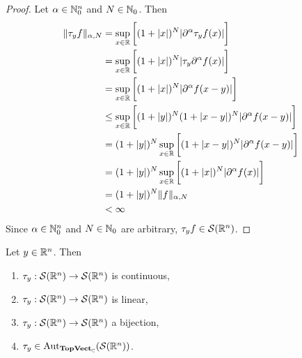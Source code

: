 \documentclass{book}
\begin{document}
	\begin{proof}
		Let $\alpha \in \mathbb{N}_0^n$ and $N \in \mathbb{N}_0$. Then 
		\begin{align*}
			\|\tau_y f\|_{\alpha, N}
			& = \sup_{x \in \mathbb{R}} \bigg[ (1+|x|)^N |\partial^{\alpha} \tau_yf(x)|\bigg] \\
			& =  \sup_{x \in \mathbb{R}} \bigg[ (1+|x|)^N | \tau_y\partial^{\alpha} f(x)|\bigg] \\ 
			& =  \sup_{x \in \mathbb{R}} \bigg[ (1+|x|)^N |\partial^{\alpha} f(x - y)|\bigg] \\ 
			& \leq \sup_{x \in \mathbb{R}} \bigg[ (1+|y|)^N(1 + |x -y|)^N |\partial^{\alpha} f(x - y)|\bigg] \\ 
			& = (1+|y|)^N\sup_{x \in \mathbb{R}} \bigg[ (1 + |x -y|)^N |\partial^{\alpha} f(x - y)|\bigg] \\ 
			& = (1+|y|)^N\sup_{x \in \mathbb{R}} \bigg[ (1 + |x|)^N |\partial^{\alpha} f(x)|\bigg] \\ 
			& = (1+|y|)^N \|f\|_{\alpha, N} \\ 
			& < \infty
		\end{align*}
		Since $\alpha \in \mathbb{N}_0^n$ and $N \in \mathbb{N}_0$ are arbitrary, $\tau_y f \in \mathcal{S}(\mathbb{R}^n)$.
	\end{proof}

	\begin{ex}
		Let $y \in \mathbb{R}^n$. Then 
		\begin{enumerate}
			\item $\tau_y: \mathcal{S}(\mathbb{R}^n) \rightarrow \mathcal{S}(\mathbb{R}^n)$ is continuous,
			\item $\tau_y: \mathcal{S}(\mathbb{R}^n) \rightarrow \mathcal{S}(\mathbb{R}^n)$ is linear,
			\item $\tau_y: \mathcal{S}(\mathbb{R}^n) \rightarrow \mathcal{S}(\mathbb{R}^n)$ a bijection,
			\item $\tau_y \in \operatorname{Aut}_{\operatorname*{\text{\textbf{TopVect}}}_{\mathbb{C}}}(\mathcal{S}(\mathbb{R}^n))$.
		\end{enumerate}
	\end{ex}
\end{document}
